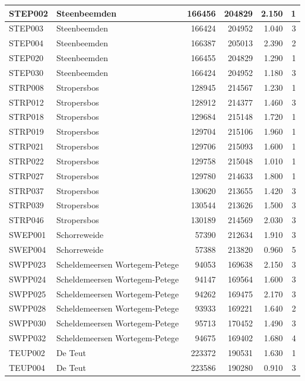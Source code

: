 \documentclass[11pt,]{book}
\begin{document}
\begin{table}
\begin{tabular}[t]{l|l|r|r|r|r}
\hline
STEP002 & Steenbeemden & 166456 & 204829 & 2.150 & 1\\
\hline
STEP003 & Steenbeemden & 166424 & 204952 & 1.040 & 3\\
\hline
STEP004 & Steenbeemden & 166387 & 205013 & 2.390 & 2\\
\hline
STEP020 & Steenbeemden & 166455 & 204829 & 1.290 & 1\\
\hline
STEP030 & Steenbeemden & 166424 & 204952 & 1.180 & 3\\
\hline
STRP008 & Stropersbos & 128945 & 214567 & 1.230 & 1\\
\hline
STRP012 & Stropersbos & 128912 & 214377 & 1.460 & 3\\
\hline
STRP018 & Stropersbos & 129684 & 215148 & 1.720 & 1\\
\hline
STRP019 & Stropersbos & 129704 & 215106 & 1.960 & 1\\
\hline
STRP021 & Stropersbos & 129706 & 215093 & 1.600 & 1\\
\hline
STRP022 & Stropersbos & 129758 & 215048 & 1.010 & 1\\
\hline
STRP027 & Stropersbos & 129780 & 214633 & 1.800 & 1\\
\hline
STRP037 & Stropersbos & 130620 & 213655 & 1.420 & 3\\
\hline
STRP039 & Stropersbos & 130544 & 213626 & 1.500 & 3\\
\hline
STRP046 & Stropersbos & 130189 & 214569 & 2.030 & 3\\
\hline
SWEP001 & Schorreweide & 57390 & 212634 & 1.910 & 3\\
\hline
SWEP004 & Schorreweide & 57388 & 213820 & 0.960 & 5\\
\hline
SWPP023 & Scheldemeersen Wortegem-Petege & 94053 & 169638 & 2.150 & 3\\
\hline
SWPP024 & Scheldemeersen Wortegem-Petege & 94147 & 169564 & 1.600 & 3\\
\hline
SWPP025 & Scheldemeersen Wortegem-Petege & 94262 & 169475 & 2.170 & 3\\
\hline
SWPP028 & Scheldemeersen Wortegem-Petege & 93933 & 169221 & 1.640 & 2\\
\hline
SWPP030 & Scheldemeersen Wortegem-Petege & 95713 & 170452 & 1.490 & 3\\
\hline
SWPP032 & Scheldemeersen Wortegem-Petege & 94675 & 169402 & 1.680 & 4\\
\hline
TEUP002 & De Teut & 223372 & 190531 & 1.630 & 1\\
\hline
TEUP004 & De Teut & 223586 & 190280 & 0.910 & 3\\

\end{tabular}
\end{table}
\end{document}
